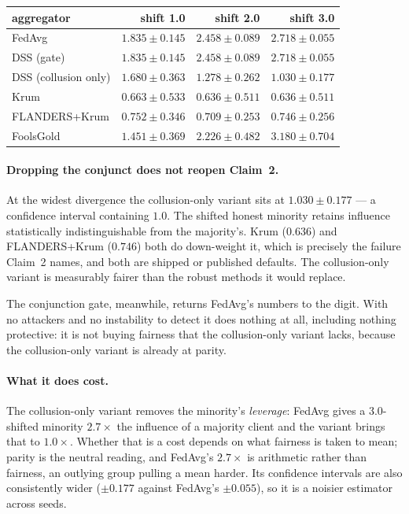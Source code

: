 \documentclass[11pt,a4paper]{article}
\begin{document}
\begin{center}
\begin{tabular}{lrrr}
\hline
aggregator & shift 1.0 & shift 2.0 & shift 3.0 \\
\hline
FedAvg & $1.835 \pm 0.145$ & $2.458 \pm 0.089$ & $2.718 \pm 0.055$ \\
DSS (gate) & $1.835 \pm 0.145$ & $2.458 \pm 0.089$ & $2.718 \pm 0.055$ \\
DSS (collusion only) & $1.680 \pm 0.363$ & $1.278 \pm 0.262$ & $\mathbf{1.030 \pm 0.177}$ \\
Krum & $0.663 \pm 0.533$ & $0.636 \pm 0.511$ & $0.636 \pm 0.511$ \\
FLANDERS+Krum & $0.752 \pm 0.346$ & $0.709 \pm 0.253$ & $0.746 \pm 0.256$ \\
FoolsGold & $1.451 \pm 0.369$ & $2.226 \pm 0.482$ & $3.180 \pm 0.704$ \\
\hline
\end{tabular}
\end{center}

\paragraph{Dropping the conjunct does not reopen Claim~2.} At the widest
divergence the collusion-only variant sits at $1.030 \pm 0.177$ --- a
confidence interval containing $1.0$. The shifted honest minority
retains influence statistically indistinguishable from the majority's.
Krum ($0.636$) and FLANDERS+Krum ($0.746$) both do down-weight it, which
is precisely the failure Claim~2 names, and both are shipped or
published defaults. The collusion-only variant is measurably fairer than
the robust methods it would replace.

The conjunction gate, meanwhile, returns FedAvg's numbers to the digit.
With no attackers and no instability to detect it does nothing at all,
including nothing protective: it is not buying fairness that the
collusion-only variant lacks, because the collusion-only variant is
already at parity.

\paragraph{What it does cost.} The collusion-only variant removes the
minority's \emph{leverage}: FedAvg gives a 3.0-shifted minority $2.7\times$
the influence of a majority client and the variant brings that to
$1.0\times$. Whether that is a cost depends on what fairness is taken to
mean; parity is the neutral reading, and FedAvg's $2.7\times$ is
arithmetic rather than fairness, an outlying group pulling a mean
harder. Its confidence intervals are also consistently wider
($\pm 0.177$ against FedAvg's $\pm 0.055$), so it is a noisier estimator
across seeds.
\end{document}
